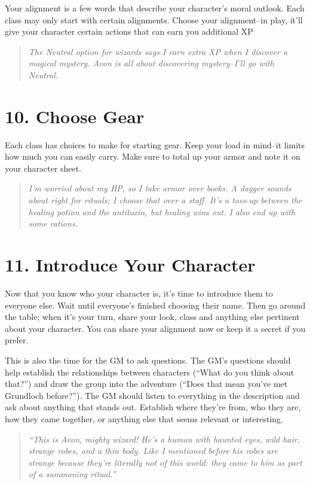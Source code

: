 Your alignment is a few words that describe your character's moral outlook. Each class may only start with certain alignments. Choose your alignment--in play, it'll give your character certain actions that can earn you additional XP

\begin{quote}
\emph{The Neutral option for wizards says I earn extra XP when I discover a magical mystery. Avon is all about discovering mystery--I'll go with Neutral.}
\end{quote}
\section{10. Choose Gear}

Each class has choices to make for starting gear. Keep your load in mind--it limits how much you can easily carry. Make sure to total up your armor and note it on your character sheet.

\begin{quote}
\emph{I'm worried about my HP, so I take armor over books. A dagger sounds about right for rituals; I choose that over a staff. It's a toss-up between the healing potion and the antitoxin, but healing wins out. I also end up with some rations.}
\end{quote}
\section{11. Introduce Your Character}

Now that you know who your character is, it's time to introduce them to everyone else. Wait until everyone's finished choosing their name. Then go around the table; when it's your turn, share your look, class and anything else pertinent about your character. You can share your alignment now or keep it a secret if you prefer.

This is also the time for the GM to ask questions. The GM's questions should help establish the relationships between characters (``What do you think about that?'') and draw the group into the adventure (``Does that mean you've met Grundloch before?''). The GM should listen to everything in the description and ask about anything that stands out. Establish where they're from, who they are, how they came together, or anything else that seems relevant or interesting.

\begin{quote}
\emph{``This is Avon, mighty wizard! He's a human with haunted eyes, wild hair, strange robes, and a thin body. Like I mentioned before his robes are strange because they're literally not of this world: they came to him as part of a summoning ritual.''}
\end{quote}
